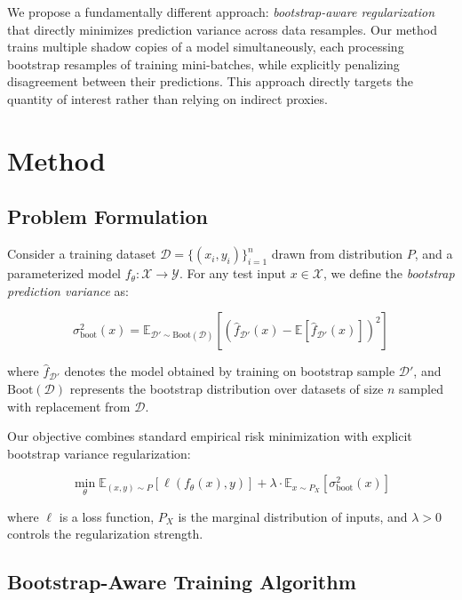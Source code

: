 \documentclass[12pt, letterpaper]{article}
\begin{document}
We propose a fundamentally different approach: \emph{bootstrap-aware regularization} that directly minimizes prediction variance across data resamples. Our method trains multiple shadow copies of a model simultaneously, each processing bootstrap resamples of training mini-batches, while explicitly penalizing disagreement between their predictions. This approach directly targets the quantity of interest rather than relying on indirect proxies.

\section{Method}

\subsection{Problem Formulation}

Consider a training dataset $\mathcal{D} = \{(x_i, y_i)\}_{i=1}^n$ drawn from distribution $P$, and a parameterized model $f_\theta: \mathcal{X} \rightarrow \mathcal{Y}$. For any test input $x \in \mathcal{X}$, we define the \emph{bootstrap prediction variance} as:

\begin{equation}
\sigma^2_{\text{boot}}(x) = \mathbb{E}_{\mathcal{D}' \sim \text{Boot}(\mathcal{D})}\left[(\hat{f}_{\mathcal{D}'}(x) - \mathbb{E}[\hat{f}_{\mathcal{D}'}(x)])^2\right]
\end{equation}

where $\hat{f}_{\mathcal{D}'}$ denotes the model obtained by training on bootstrap sample $\mathcal{D}'$, and $\text{Boot}(\mathcal{D})$ represents the bootstrap distribution over datasets of size $n$ sampled with replacement from $\mathcal{D}$.

Our objective combines standard empirical risk minimization with explicit bootstrap variance regularization:

\begin{equation}
\min_\theta \mathbb{E}_{(x,y) \sim P}[\ell(f_\theta(x), y)] + \lambda \cdot \mathbb{E}_{x \sim P_X}[\sigma^2_{\text{boot}}(x)]
\end{equation}

where $\ell$ is a loss function, $P_X$ is the marginal distribution of inputs, and $\lambda > 0$ controls the regularization strength.

\subsection{Bootstrap-Aware Training Algorithm}
\end{document}
